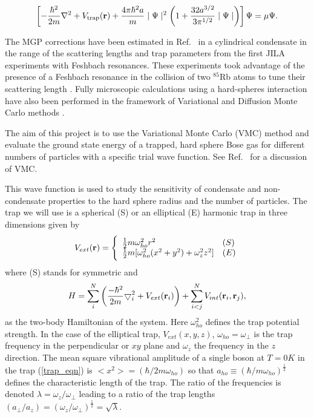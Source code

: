\documentclass[10pt]{article}
\begin{document}
\begin{equation}
  \left [ - \frac {\hbar^2}{2m} \nabla^2 + V_{\mathrm{trap}}({\bf r})+\frac {4 \pi \hbar^2 a}{m} \mid \Psi \mid^2 
    \left (1 + \frac {32 a^{3/2}}{3 \pi^{1/2}} \mid \Psi\mid \right)
    \right ] \Psi =  \mu \Psi .
\label{gp2}
\end{equation}

The MGP corrections have been estimated in  Ref.~\cite{fabro99} in a cylindrical 
condensate in the range of the scattering lengths and trap parameters
from the first JILA experiments with Feshbach resonances. These experiments took 
advantage of the  presence of a Feshbach resonance in the collision of two
$^{85}$Rb atoms to tune their scattering length \cite{cornish00}.
Fully microscopic calculations using  a hard-spheres interaction have
also been performed in the framework of Variational and Diffusion Monte
Carlo methods \cite{dubois2001,glyde2002,glyde2003,blume1}. 

 The aim of this project is to use the Variational Monte
 Carlo (VMC) method and evaluate 
 the ground state energy of
 a trapped, hard sphere Bose gas for different numbers of particles
 with a specific
 trial wave function. See Ref.~\cite{abinitio} for a discussion of VMC.

 This wave function is used 
 to study the sensitivity of condensate and 
 non-condensate properties to the hard sphere radius and the number 
 of particles.
 The trap we will use is  a spherical (S) or 
 an elliptical (E) harmonic trap in three dimensions given by 
  \begin{equation}
 V_{ext}({\bf r}) = 
 \Bigg\{
 \begin{array}{ll}
	 \frac{1}{2}m\omega_{ho}^2r^2 & (S)\\
 \strut
	 \frac{1}{2}m[\omega_{ho}^2(x^2+y^2) + \omega_z^2z^2] & (E)
 \label{trap_eqn}
 \end{array}
 \end{equation}
 where (S) stands for symmetric and 
 \begin{equation}
     H = \sum_i^N \left(
	 \frac{-\hbar^2}{2m}
	 { \bigtriangledown }_{i}^2 +
	 V_{ext}({\bf{r}}_i)\right)  +
	 \sum_{i<j}^{N} V_{int}({\bf{r}}_i,{\bf{r}}_j),
 \end{equation}
 as the two-body Hamiltonian of the system.
 Here $\omega_{ho}^2$ defines the trap potential strength.  In the case of the
 elliptical trap, $V_{ext}(x,y,z)$, $\omega_{ho}=\omega_{\perp}$ is the trap frequency
 in the perpendicular or $xy$ plane and $\omega_z$ the frequency in the $z$
 direction.
 The mean square vibrational amplitude of a single boson at $T=0K$ in the 
 trap (\ref{trap_eqn}) is $<x^2>=(\hbar/2m\omega_{ho})$ so that 
 $a_{ho} \equiv (\hbar/m\omega_{ho})^{\frac{1}{2}}$ defines the 
 characteristic length
 of the trap.  The ratio of the frequencies is denoted 
 $\lambda=\omega_z/\omega_{\perp}$ leading to a ratio of the
 trap lengths
 $(a_{\perp}/a_z)=(\omega_z/\omega_{\perp})^{\frac{1}{2}} = \sqrt{\lambda}$.
\end{document}
